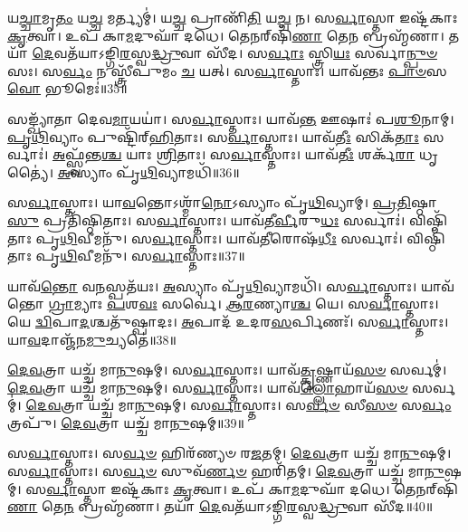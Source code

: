    𑌯\-\ul{𑌚𑍍𑌚𑌾}\-𑌮𑍃\-\ul{𑌤𑌂} 𑌯\-\ul{𑌚𑍍𑌚} 𑌮𑌰𑍍𑌤𑍍𑌯𑌮𑍍॑।
   𑌯\-\ul{𑌚𑍍𑌚} 𑌪𑍍𑌰𑌾𑌣𑌿᳴\-\ul{𑌤𑌿} 𑌯\-\ul{𑌚𑍍𑌚} 𑌨।
   𑌸\-\ul{𑌰𑍍𑌵𑌾}\-𑌸𑍍𑌤𑌾 𑌇𑌷𑍍𑌟᳴𑌕𑌾𑌃 \ul{𑌕𑍃}\-𑌤𑍍𑌵𑌾।
   𑌉𑌪᳴ 𑌕𑌾\-\ul{𑌮}\-𑌦𑍁𑌘𑌾᳴ 𑌦𑌧𑍇।
   𑌤𑍇𑌨𑌰𑍍‌𑌷𑌿᳴\-\ul{𑌣𑌾} 𑌤𑍇\-\ul{𑌨} 𑌬𑍍𑌰𑌹𑍍𑌮᳴𑌣𑌾।
   𑌤𑌯𑌾᳴ \ul{𑌦𑍇}\-𑌵𑌤᳴𑌯𑌾𑌽𑌙𑍍𑌗𑌿\-\ul{𑌰}\-𑌸𑍍𑌵\-\ul{𑌦𑍍𑌧𑍍𑌰𑍁}\-𑌵𑌾 𑌸𑍀᳴𑌦।
   𑌸\-\ul{𑌰𑍍𑌵𑌾𑌃} 𑌸𑍍𑌤𑍍𑌰𑌿\-\ul{𑌯𑌃} 𑌸𑌰𑍍𑌵𑌾॑\-\ul{𑌨𑍍𑌪𑍁}\-\-\ul{𑍞}\-𑌸𑌃।
   𑌸\-\ul{𑌰𑍍𑌵𑌂} 𑌨 𑌸𑍍𑌤𑍍𑌰𑍀᳴𑌪𑍁𑌮𑌂 \ul{𑌚} 𑌯𑌤𑍍।
   𑌸\-\ul{𑌰𑍍𑌵𑌾}\-𑌸𑍍𑌤𑌾𑌃।
   𑌯𑌾𑌵᳴𑌨𑍍𑌤𑌃 \ul{𑌪𑌾}\-\-\ul{𑍞}\-𑌸\-\ul{𑌵𑍋} 𑌭𑍂𑌮𑍇𑌃॑॥35॥

   𑌸𑌙𑍍𑌖𑍍𑌯𑌾᳴𑌤𑌾 𑌦𑍇𑌵\-\ul{𑌮𑌾}\-𑌯𑌯𑌾॑।
   𑌸\-\ul{𑌰𑍍𑌵𑌾}\-𑌸𑍍𑌤𑌾𑌃।
   𑌯𑌾𑌵᳴\-\ul{𑌨𑍍𑌤} 𑌊𑌷𑌾𑌃॑ 𑌪\-\ul{𑌶𑍂}\-𑌨𑌾𑌮𑍍।
   \ul{𑌪𑍃}\-\-\ul{𑌥𑌿}\-𑌵𑍍𑌯𑌾𑌂 𑌪𑍁𑌷𑍍𑌟𑌿᳴𑌰𑍍‌\-\ul{𑌹𑌿}\-𑌤𑌾𑌃।
   𑌸\-\ul{𑌰𑍍𑌵𑌾}\-𑌸𑍍𑌤𑌾𑌃।
   𑌯𑌾𑌵᳴\-\ul{𑌤𑍀𑌃} 𑌸𑌿𑌕᳴\-\ul{𑌤𑌾𑌃} 𑌸𑌰𑍍𑌵𑌾𑌃॑।
   \ul{𑌅}\-𑌫𑍍𑌸𑍍𑌵᳴𑌨𑍍𑌤\-\ul{𑌶𑍍𑌚} 𑌯𑌾𑌃 \ul{𑌶𑍍𑌰𑌿}\-𑌤𑌾𑌃।
   𑌸\-\ul{𑌰𑍍𑌵𑌾}\-𑌸𑍍𑌤𑌾𑌃।
   𑌯𑌾𑌵᳴\-\ul{𑌤𑍀𑌃} 𑌶𑌰𑍍𑌕᳴\-\ul{𑌰𑌾} 𑌧𑍃𑌤𑍍𑌯𑍈॑।
   \ul{𑌅}\-𑌸𑍍𑌯𑌾𑌂 𑌪𑍃᳴\-\ul{𑌥𑌿}\-𑌵𑍍𑌯𑌾𑌮𑌧𑌿᳴॥36॥	

   𑌸\-\ul{𑌰𑍍𑌵𑌾}\-𑌸𑍍𑌤𑌾𑌃।
   𑌯𑌾\-\ul{𑌵}\-𑌨𑍍𑌤𑍋𑌽𑌶𑍍𑌮𑌾᳴\-\ul{𑌨𑍋}\-𑌽𑌸𑍍𑌯𑌾𑌂 𑌪𑍃᳴\-\ul{𑌥𑌿}\-𑌵𑍍𑌯𑌾𑌮𑍍।
   \ul{𑌪𑍍𑌰}\-\-\ul{𑌤𑌿}\-𑌷𑍍𑌠𑌾\-\ul{𑌸𑍁} 𑌪𑍍𑌰𑌤𑌿᳴𑌷𑍍𑌠𑌿𑌤𑌾𑌃।
   𑌸\-\ul{𑌰𑍍𑌵𑌾}\-𑌸𑍍𑌤𑌾𑌃।
   𑌯𑌾𑌵᳴𑌤𑍀\-\ul{𑌰𑍍𑌵𑍀}\-𑌰𑍁\-\ul{𑌧𑌃} 𑌸𑌰𑍍𑌵𑌾𑌃॑।
   𑌵𑌿𑌷𑍍𑌠𑌿᳴𑌤𑌾𑌃 𑌪𑍃\-\ul{𑌥𑌿}\-𑌵𑍀𑌮𑌨𑍁᳴।
   𑌸\-\ul{𑌰𑍍𑌵𑌾}\-𑌸𑍍𑌤𑌾𑌃।
   𑌯𑌾𑌵᳴\-\ul{𑌤𑍀}\-𑌰𑍋𑌷᳴\-\ul{𑌧𑍀𑌃} 𑌸𑌰𑍍𑌵𑌾𑌃॑।
   𑌵𑌿𑌷𑍍𑌠𑌿᳴𑌤𑌾𑌃 𑌪𑍃\-\ul{𑌥𑌿}\-𑌵𑍀𑌮𑌨𑍁᳴।
   𑌸\-\ul{𑌰𑍍𑌵𑌾}\-𑌸𑍍𑌤𑌾𑌃॥37॥

   𑌯𑌾𑌵᳴\-\ul{𑌨𑍍𑌤𑍋} 𑌵\-\ul{𑌨}\-𑌸𑍍𑌪𑌤᳴𑌯𑌃।
   \ul{𑌅}\-𑌸𑍍𑌯𑌾𑌂 𑌪𑍃᳴\-\ul{𑌥𑌿}\-𑌵𑍍𑌯𑌾𑌮𑌧𑌿᳴।
   𑌸\-\ul{𑌰𑍍𑌵𑌾}\-𑌸𑍍𑌤𑌾𑌃।
   𑌯𑌾𑌵᳴𑌨𑍍𑌤𑍋 \ul{𑌗𑍍𑌰𑌾}\-𑌮𑍍𑌯𑌾𑌃 \ul{𑌪}\-𑌶\-\ul{𑌵𑌃} 𑌸𑌰𑍍𑌵𑍇॑।
   \ul{𑌆}\-\-\ul{𑌰}\-𑌣𑍍𑌯𑌾\-\ul{𑌶𑍍𑌚} 𑌯𑍇।
   𑌸\-\ul{𑌰𑍍𑌵𑌾}\-𑌸𑍍𑌤𑌾𑌃।
   𑌯𑍇 \ul{𑌦𑍍𑌵𑌿}\-𑌪𑌾\-\ul{𑌦}\-𑌶𑍍𑌚𑌤𑍁᳴𑌷𑍍𑌪𑌾𑌦𑌃।
   \ul{𑌅}\-𑌪𑌾𑌦᳴ 𑌉𑌦𑌰\-\ul{𑌸}\-𑌰𑍍𑌪𑌿𑌣𑌃᳴।
   𑌸\-\ul{𑌰𑍍𑌵𑌾}\-𑌸𑍍𑌤𑌾𑌃।
   𑌯𑌾\-\ul{𑌵}\-𑌦𑌾𑌞𑍍𑌜᳴𑌨\-\ul{𑌮𑍁}\-𑌚𑍍𑌯𑌤𑍇॑॥38॥

   \ul{𑌦𑍇}\-\-\ul{𑌵}\-𑌤𑍍𑌰𑌾 𑌯𑌚𑍍𑌚᳴ 𑌮𑌾\-\ul{𑌨𑍁}\-𑌷𑌮𑍍।
   𑌸\-\ul{𑌰𑍍𑌵𑌾}\-𑌸𑍍𑌤𑌾𑌃।
   𑌯𑌾𑌵᳴\-\ul{𑌤𑍍𑌕𑍃}\-𑌷𑍍𑌣𑌾𑌯᳴\-\ul{𑌸}\-\-\ul{𑍞} 𑌸𑌰𑍍𑌵𑌮𑍍॑।
   \ul{𑌦𑍇}\-\-\ul{𑌵}\-𑌤𑍍𑌰𑌾 𑌯𑌚𑍍𑌚᳴ 𑌮𑌾\-\ul{𑌨𑍁}\-𑌷𑌮𑍍।
   𑌸\-\ul{𑌰𑍍𑌵𑌾}\-𑌸𑍍𑌤𑌾𑌃।
   𑌯𑌾𑌵᳴\-\ul{𑌲𑍍𑌲𑍋}\-𑌹𑌾𑌯᳴\-\ul{𑌸}\-\-\ul{𑍞} 𑌸𑌰𑍍𑌵𑌮𑍍॑।
   \ul{𑌦𑍇}\-\-\ul{𑌵}\-𑌤𑍍𑌰𑌾 𑌯𑌚𑍍𑌚᳴ 𑌮𑌾\-\ul{𑌨𑍁}\-𑌷𑌮𑍍।
   𑌸\-\ul{𑌰𑍍𑌵𑌾}\-𑌸𑍍𑌤𑌾𑌃।
   𑌸\-\ul{𑌰𑍍𑌵}\-\-\ul{𑍞} 𑌸𑍀\-\ul{𑌸}\-\-\ul{𑍞} 𑌸\-\ul{𑌰𑍍𑌵𑌂} 𑌤𑍍𑌰𑌪𑍁᳴।
   \ul{𑌦𑍇}\-\-\ul{𑌵}\-𑌤𑍍𑌰𑌾 𑌯𑌚𑍍𑌚᳴ 𑌮𑌾\-\ul{𑌨𑍁}\-𑌷𑌮𑍍॥39॥

   𑌸\-\ul{𑌰𑍍𑌵𑌾}\-𑌸𑍍𑌤𑌾𑌃।
   𑌸\-\ul{𑌰𑍍𑌵}\-\-\ul{𑍞} 𑌹𑌿𑌰᳴𑌣𑍍𑌯𑍞 𑌰\-\ul{𑌜}\-𑌤𑌮𑍍।
   \ul{𑌦𑍇}\-\-\ul{𑌵}\-𑌤𑍍𑌰𑌾 𑌯𑌚𑍍𑌚᳴ 𑌮𑌾\-\ul{𑌨𑍁}\-𑌷𑌮𑍍।
   𑌸\-\ul{𑌰𑍍𑌵𑌾}\-𑌸𑍍𑌤𑌾𑌃।
   𑌸\-\ul{𑌰𑍍𑌵}\-\-\ul{𑍞} 𑌸𑍁𑌵᳴\-\ul{𑌰𑍍𑌣}\-\-\ul{𑍞} 𑌹𑌰𑌿᳴𑌤𑌮𑍍।
   \ul{𑌦𑍇}\-\-\ul{𑌵}\-𑌤𑍍𑌰𑌾 𑌯𑌚𑍍𑌚᳴ 𑌮𑌾\-\ul{𑌨𑍁}\-𑌷𑌮𑍍।
   𑌸\-\ul{𑌰𑍍𑌵𑌾}\-𑌸𑍍𑌤𑌾 𑌇𑌷𑍍𑌟᳴𑌕𑌾𑌃 \ul{𑌕𑍃}\-𑌤𑍍𑌵𑌾।
   𑌉𑌪᳴ 𑌕𑌾\-\ul{𑌮}\-𑌦𑍁𑌘𑌾᳴ 𑌦𑌧𑍇।
   𑌤𑍇𑌨𑌰𑍍‌𑌷𑌿᳴\-\ul{𑌣𑌾} 𑌤𑍇\-\ul{𑌨} 𑌬𑍍𑌰𑌹𑍍𑌮᳴𑌣𑌾।
   𑌤𑌯𑌾᳴ \ul{𑌦𑍇}\-𑌵𑌤᳴𑌯𑌾𑌽𑌙𑍍𑌗𑌿\-\ul{𑌰}\-𑌸𑍍𑌵\-\ul{𑌦𑍍𑌧𑍍𑌰𑍁}\-𑌵𑌾 𑌸𑍀᳴𑌦॥40॥
   \anuvakamend
  
